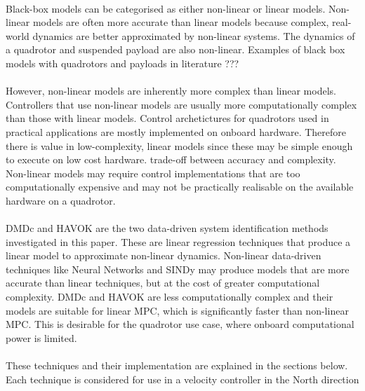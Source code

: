         \paragraph{}
        Black-box models can be categorised as either non-linear or linear models.
        Non-linear models are often more accurate than linear models because complex, real-world dynamics are better approximated by non-linear systems.
        The dynamics of a quadrotor and suspended payload are also non-linear.
        Examples of black box models with quadrotors and payloads in literature ???

        \paragraph{}
        However, non-linear models are inherently more complex than linear models. 
        Controllers that use non-linear models are usually more computationally complex than those with linear models.
        Control archetictures for quadrotors used in practical applications are mostly implemented on onboard hardware.
        Therefore there is value in low-complexity, linear models since these may be simple enough to execute on low cost hardware.
        trade-off between accuracy and complexity.
        Non-linear models may require control implementations that are too computationally expensive and may not be practically realisable on the available hardware on a quadrotor.
        
        \paragraph{}
        DMDc and HAVOK are the two data-driven system identification methods investigated in this paper. 
        These are linear regression techniques that produce a linear model to approximate non-linear dynamics.
        Non-linear data-driven techniques like Neural Networks and SINDy \cite{Brunton2016} may produce models that are more accurate than linear techniques, 
        but at the cost of greater computational complexity.
        DMDc and HAVOK are less computationally complex and their models are suitable for linear MPC, which is significantly faster than non-linear MPC.
        This is desirable for the quadrotor use case, where onboard computational power is limited.
        
        \paragraph{}
        These techniques and their implementation are explained in the sections below.
        Each technique is considered for use in a velocity controller in the North direction

